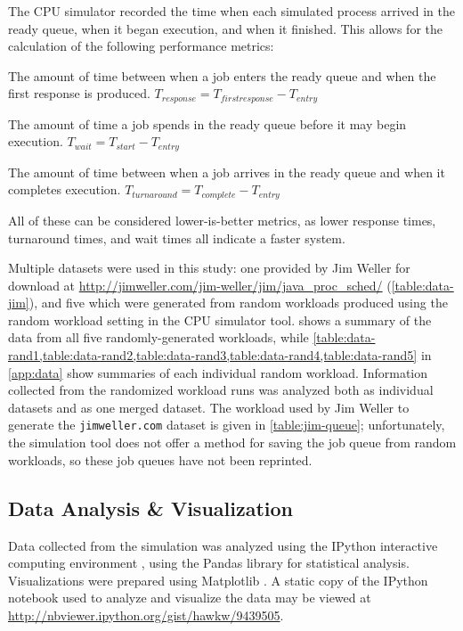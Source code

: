\documentclass[12pt,letterpaper]{article}
\begin{document}
			The CPU simulator recorded the time when each simulated process arrived in the ready queue, when it began execution, and when it finished. This allows for the calculation of the following performance metrics:

				\begin{description}[leftmargin=4.5cm, style=sameline]
					\item[Response Time]{The amount of time between when a job enters the ready queue and when the first response is produced. $T_{response} = T_{first response} - T_{entry}$}
					\item[Wait Time]{The amount of time a job spends in the ready queue before it may begin execution. $T_{wait} = T_{start} - T_{entry}$}
					\item[Turnaround Time]{The amount of time between when a job arrives in the ready queue and when it completes execution. $T_{turnaround} = T_{complete} - T_{entry}$}
				\end{description}

			All of these can be considered lower-is-better metrics, as lower response times, turnaround times, and wait times all indicate a faster system.

			Multiple datasets were used in this study: one provided by Jim Weller for download at \url{http://jimweller.com/jim-weller/jim/java_proc_sched/} (\cref{table:data-jim}), and five which were generated from random workloads produced using the random workload setting in the CPU simulator tool.  shows a summary of the data from all five randomly-generated workloads, while \cref{table:data-rand1,table:data-rand2,table:data-rand3,table:data-rand4,table:data-rand5} in \cref{app:data} show summaries of each individual random workload. Information collected from the randomized workload runs was analyzed both as individual datasets and as one merged dataset. The workload used by Jim Weller to generate the \texttt{jimweller.com} dataset is given in \cref{table:jim-queue}; unfortunately, the simulation tool does not offer a method for saving the job queue from random workloads, so these job queues have not been reprinted.

		\subsection{Data Analysis \& Visualization}
			Data collected from the simulation was analyzed using the IPython interactive computing environment \cite{ipython}, using the Pandas library \cite{ pandas} for statistical analysis. Visualizations were prepared using Matplotlib \cite{matplotlib}. A static copy of the IPython notebook used to analyze and visualize the data may be viewed at \url{http://nbviewer.ipython.org/gist/hawkw/9439505}.
\end{document}
